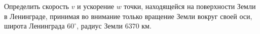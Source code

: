 Определить скорость $v$ и ускорение $w$ точки, находящейся на
поверхности Земли в Ленинграде, принимая во внимание только вращение
Земли вокруг своей оси, широта Ленинграда $60^\circ$, радиус Земли
$6370$ км.
